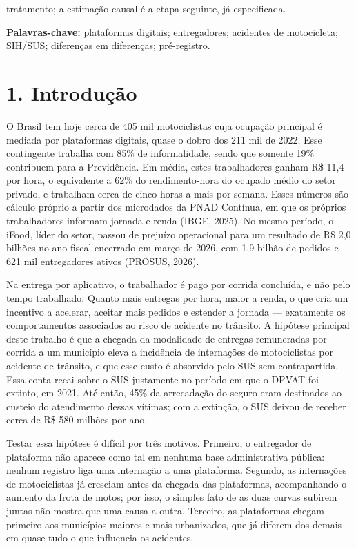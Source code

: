 \documentclass[
  11pt,
]{article}
\begin{document}
tratamento; a estimação causal é a etapa seguinte, já especificada.

\textbf{Palavras-chave:} plataformas digitais; entregadores; acidentes de motocicleta; SIH/SUS; diferenças em diferenças; pré-registro.

\hypertarget{introduuxe7uxe3o}{%
\section{1. Introdução}\label{introduuxe7uxe3o}}

O Brasil tem hoje cerca de 405 mil motociclistas cuja ocupação principal é mediada por plataformas digitais, quase o dobro dos 211 mil de 2022. Esse contingente trabalha com 85\% de informalidade, sendo que somente 19\% contribuem para a Previdência. Em média, estes trabalhadores ganham R\$ 11,4 por hora, o equivalente a 62\% do rendimento-hora do ocupado médio do setor privado, e trabalham cerca de cinco horas a mais por semana. Esses números são cálculo próprio a partir dos microdados da PNAD Contínua, em que os próprios trabalhadores informam jornada e renda (IBGE, 2025). No mesmo período, o iFood, líder do setor, passou de prejuízo operacional para um resultado de R\$ 2,0 bilhões no ano fiscal encerrado em março de 2026, com 1,9 bilhão de pedidos e 621 mil entregadores ativos (PROSUS, 2026).

Na entrega por aplicativo, o trabalhador é pago por corrida concluída, e não pelo tempo trabalhado. Quanto mais entregas por hora, maior a renda, o que cria um incentivo a acelerar, aceitar mais pedidos e estender a jornada --- exatamente os comportamentos associados ao risco de acidente no trânsito. A hipótese principal deste trabalho é que a chegada da modalidade de entregas remuneradas por corrida a um município eleva a incidência de internações de motociclistas por acidente de trânsito, e que esse custo é absorvido pelo SUS sem contrapartida. Essa conta recai sobre o SUS justamente no período em que o DPVAT foi extinto, em 2021. Até então, 45\% da arrecadação do seguro eram destinados ao custeio do atendimento dessas vítimas; com a extinção, o SUS deixou de receber cerca de R\$ 580 milhões por ano.

Testar essa hipótese é difícil por três motivos. Primeiro, o entregador de plataforma não aparece como tal em nenhuma base administrativa pública: nenhum registro liga uma internação a uma plataforma. Segundo, as internações de motociclistas já cresciam antes da chegada das plataformas, acompanhando o aumento da frota de motos; por isso, o simples fato de as duas curvas subirem juntas não mostra que uma causa a outra. Terceiro, as plataformas chegam primeiro aos municípios maiores e mais urbanizados, que já diferem dos demais em quase tudo o que influencia os acidentes.
\end{document}

